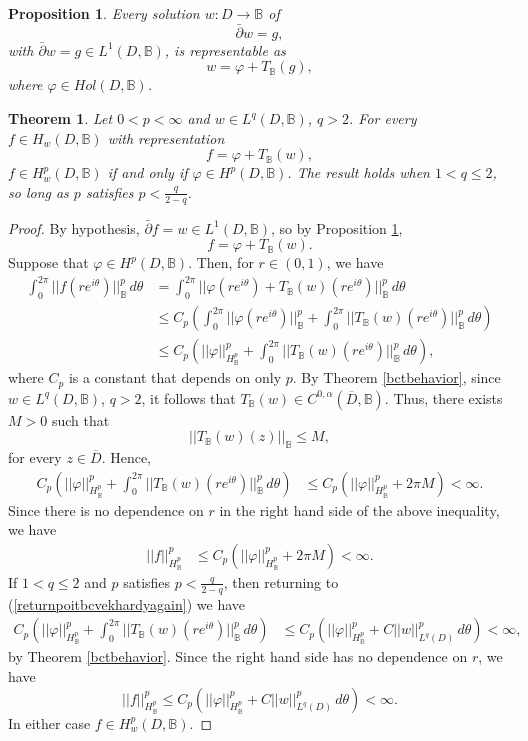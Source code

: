 \documentclass[10pt,a4paper]{amsart}
\newtheorem{theorem}{Theorem}
\newtheorem{prop}{Proposition}
\newcommand{\bc}{\mathbb{B}}
\newcommand{\dbar}{\bar\partial}
\newcommand{\holb}{Hol(D,\bc)}
\newcommand{\hpb}{H^p(D,\bc)}
\newcommand{\hw}{H_w(D, \bc)}
\newcommand{\hwp}{H^p_{w}(D,\bc)}
\begin{document}
\begin{prop}\label{genbcnonhomogrep}
    Every solution $w: D \to \bc$ of 
    \[
        \dbar w = g,
    \]
    with $\dbar w = g \in L^1(D, \bc)$, is representable as 
    \[
        w = \varphi + T_\bc(g),
    \]
    where $\varphi \in \holb$. 
\end{prop}

\begin{theorem}\label{generalbchardyrep}
    Let $0 < p < \infty$ and $w \in L^q(D,\bc)$, $q>2$. For every $f \in \hw$ with representation 
    \[
        f = \varphi + T_\bc(w),
    \]
    $ f \in \hwp$ if and only if $\varphi \in \hpb$. The result holds when $1 < q \leq 2$, so long as $p$ satisfies $p < \frac{q}{2-q}$. 
\end{theorem}

\begin{proof}
By hypothesis, $\dbar f= w \in L^1(D, \bc)$, so by Proposition \ref{genbcnonhomogrep}, 
\[
        f = \varphi + T_\bc(w).
\]
Suppose that $\varphi \in H^p(D,\bc)$. Then, for $r \in (0,1)$, we have
\begin{align}
 \int_0^{2\pi} ||f(re^{i\theta})||_{\bc}^p \,d\theta 
 &= \int_0^{2\pi} ||\varphi(re^{i\theta}) + T_\bc(w)(re^{i\theta})||_{\bc}^p \,d\theta \nonumber \\ 
 &\leq C_p\left( \int_0^{2\pi} ||\varphi(re^{i\theta})||_{\bc}^p + \int_0^{2\pi} ||T_\bc(w)(re^{i\theta})||_{\bc}^p \,d\theta \right) \nonumber\\
  &\leq C_p\left( ||\varphi||_{H^p_\bc}^p + \int_0^{2\pi} ||T_\bc(w)(re^{i\theta})||_{\bc}^p \,d\theta \right), \label{returnpoitbcvekhardyagain}
\end{align}
where $C_p$ is a constant that depends on only $p$. By Theorem \ref{bctbehavior}, since $ w\in L^q(D,\bc)$, $q>2$, it follows that $T_\bc(w) \in C^{0,\alpha}(\overline{D},\bc)$. Thus, there exists $M>0$ such that 
\[
        ||T_\bc(w)(z)||_{\bc} \leq M,
\]
for every $z \in \overline{D}$. Hence, 
\begin{align*}
C_p\left( ||\varphi||_{H^p_\bc}^p + \int_0^{2\pi} ||T_\bc(w)(re^{i\theta})||_{\bc}^p \,d\theta \right)
&\leq C_p\left( ||\varphi||_{H^p_\bc}^p + 2\pi M \right)< \infty.
\end{align*}
Since there is no dependence on $r$ in the right hand side of the above inequality, we have 
\begin{align*}
||f||_{H^p_\bc}^p &\leq C_p\left( ||\varphi||_{H^p_\bc}^p + 2\pi M \right)< \infty.
\end{align*}
If $1 < q \leq 2$ and $p$ satisfies $p < \frac{q}{2-q}$, then returning to (\ref{returnpoitbcvekhardyagain}) we have
\begin{align*}
C_p\left( ||\varphi||_{H^p_\bc}^p + \int_0^{2\pi} ||T_\bc(w)(re^{i\theta})||_{\bc}^p \,d\theta \right)
&\leq C_p\left( ||\varphi||_{H^p_\bc}^p + C||w||^p_{L^q(D)} \,d\theta \right) < \infty,
\end{align*}
by Theorem \ref{bctbehavior}. Since the right hand side has no dependence on $r$, we have
\[
||f||_{H^p_\bc}^p \leq C_p\left( ||\varphi||_{H^p_\bc}^p + C||w||^p_{L^q(D)} \,d\theta \right) < \infty.
\]
In either case $f \in H^p_{w}(D,\bc)$. 


\end{proof}
\end{document}
